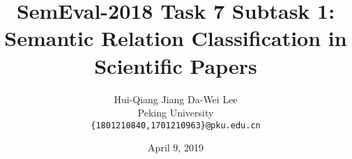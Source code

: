 \documentclass[12pt, A4]{article}
\title{SemEval-2018 Task 7 Subtask 1: Semantic Relation Classification in Scientific Papers}
\author{Hui-Qiang Jiang \quad Da-Wei Lee \\
Peking University \\
{\tt \{1801210840,1701210963\}@pku.edu.cn}}
\date{April 9, 2019}
\begin{document}
\maketitle
\begin{abstract}
  
\end{abstract}










\end{document}
